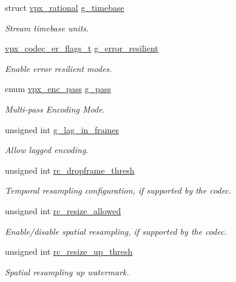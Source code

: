 \begin{DoxyCompactItemize}
struct \hyperlink{structvpx__rational}{vpx\-\_\-rational} \hyperlink{structvpx__codec__enc__cfg_a6498d378e4c29ef3e22258289e481087}{g\-\_\-timebase}
\begin{DoxyCompactList}\small\item\em Stream timebase units. \end{DoxyCompactList}\item 
\hyperlink{group__encoder_ga77e0e1fff62556a4f4d54c84467a41f3}{vpx\-\_\-codec\-\_\-er\-\_\-flags\-\_\-t} \hyperlink{structvpx__codec__enc__cfg_a4e17173b66ca0d7dfba9978625d7ba76}{g\-\_\-error\-\_\-resilient}
\begin{DoxyCompactList}\small\item\em Enable error resilient modes. \end{DoxyCompactList}\item 
enum \hyperlink{group__encoder_ga476c5417f9c15a1dc5d3f68fa44c493f}{vpx\-\_\-enc\-\_\-pass} \hyperlink{structvpx__codec__enc__cfg_a70d62d87aae7d1168746577f14a6dccf}{g\-\_\-pass}
\begin{DoxyCompactList}\small\item\em Multi-\/pass Encoding Mode. \end{DoxyCompactList}\item 
unsigned int \hyperlink{structvpx__codec__enc__cfg_a992668d9e30305f3f7ab2672ea31a890}{g\-\_\-lag\-\_\-in\-\_\-frames}
\begin{DoxyCompactList}\small\item\em Allow lagged encoding. \end{DoxyCompactList}\item 
unsigned int \hyperlink{structvpx__codec__enc__cfg_a619269f9a6904de58c4790e6806a3905}{rc\-\_\-dropframe\-\_\-thresh}
\begin{DoxyCompactList}\small\item\em Temporal resampling configuration, if supported by the codec. \end{DoxyCompactList}\item 
unsigned int \hyperlink{structvpx__codec__enc__cfg_a02a4e2f18fb0fdfff44df8b0d9a99d6c}{rc\-\_\-resize\-\_\-allowed}
\begin{DoxyCompactList}\small\item\em Enable/disable spatial resampling, if supported by the codec. \end{DoxyCompactList}\item 
unsigned int \hyperlink{structvpx__codec__enc__cfg_a855599c0660f31dfcab4a64996b4f6ad}{rc\-\_\-resize\-\_\-up\-\_\-thresh}
\begin{DoxyCompactList}\small\item\em Spatial resampling up watermark. \end{DoxyCompactList}\item 

\end{DoxyCompactItemize}
